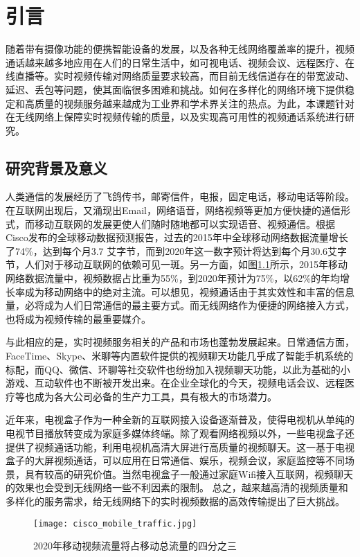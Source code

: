 \chapter{引言}
\label{chap:intro}
随着带有摄像功能的便携智能设备的发展，以及各种无线网络覆盖率的提升，视频通话越来越多地应用在人们的日常生活中，如可视电话、视频会议、远程医疗、在线直播等。实时视频传输对网络质量要求较高，而目前无线信道存在的带宽波动、延迟、丢包等问题，使其面临很多困难和挑战。如何在多样化的网络环境下提供稳定和高质量的视频服务越来越成为工业界和学术界关注的热点。为此，本课题针对在无线网络上保障实时视频传输的质量，以及实现高可用性的视频通话系统进行研究。

\section{研究背景及意义}
人类通信的发展经历了飞鸽传书，邮寄信件，电报，固定电话，移动电话等阶段。在互联网出现后，又涌现出Email，网络语音，网络视频等更加方便快捷的通信形式，而移动互联网的发展更使人们随时随地都可以实现语音、视频通信。根据Cisco发布的全球移动数据预测报告\cite{index2016global}，过去的2015年中全球移动网络数据流量增长了74\%，达到每个月3.7 艾字节，而到2020年这一数字预计将达到每个月30.6艾字节，人们对于移动互联网的依赖可见一斑。另一方面，如图\ref{fig:cisco_mobile}所示，2015年移动网络数据流量中，视频数据占比重为55\%，到2020年预计为75\%，以62\%的年均增长率成为移动网络中的绝对主流。可以想见，视频通话由于其实效性和丰富的信息量，必将成为人们日常通信的最主要方式。而无线网络作为便捷的网络接入方式，也将成为视频传输的最重要媒介。

与此相应的是，实时视频服务相关的产品和市场也蓬勃发展起来。日常通信方面，FaceTime、Skype、米聊等内置软件提供的视频聊天功能几乎成了智能手机系统的标配，而QQ、微信、环聊等社交软件也纷纷加入视频聊天功能，以此为基础的小游戏、互动软件也不断被开发出来。在企业全球化的今天，视频电话会议、远程医疗等也成为各大公司必备的生产力工具，具有极大的市场潜力。

近年来，电视盒子作为一种全新的互联网接入设备逐渐普及，使得电视机从单纯的电视节目播放转变成为家庭多媒体终端。除了观看网络视频以外，一些电视盒子还提供了视频通话功能，利用电视机高清大屏进行高质量的视频聊天。这一基于电视盒子的大屏视频通话，可以应用在日常通信、娱乐，视频会议，家庭监控等不同场景，具有较高的研究价值。当然电视盒子一般通过家庭Wifi接入互联网，视频聊天的效果也会受到无线网络一些不利因素的限制。
总之，越来越高清的视频质量和多样化的服务需求，给无线网络下的实时视频数据的高效传输提出了巨大挑战。

\begin{figure}[htbp]
  \centering
  \texttt{[image: cisco\_mobile\_traffic.jpg]}
  \caption{2020年移动视频流量将占移动总流量的四分之三}
  \label{fig:cisco_mobile}
\end{figure}

